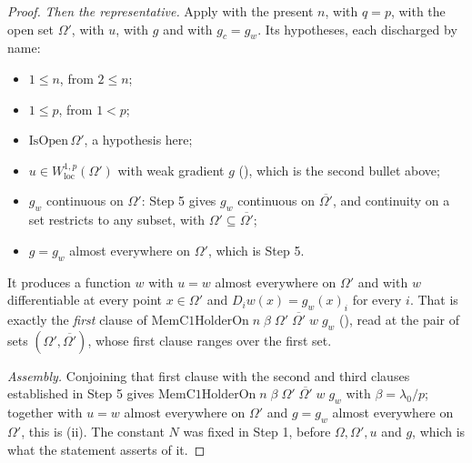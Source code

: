 \begin{proof}
\emph{Then the representative.}  Apply  with
the present $n$, with $q=p$, with the open set $\Omega'$, with $u$, with $g$ and
with $g_c=g_w$.  Its hypotheses, each discharged by name:
\begin{itemize}
\item $1\le n$, from $2\le n$;
\item $1\le p$, from $1<p$;
\item $\mathrm{IsOpen}\,\Omega'$, a hypothesis here;
\item $u\in W^{1,p}_{\mathrm{loc}}(\Omega')$ with weak gradient $g$
  (), which is the second bullet above;
\item $g_w$ continuous on $\Omega'$: Step 5 gives $g_w$ continuous on
  $\overline{\Omega'}$, and continuity on a set restricts to any subset, with
  $\Omega'\subseteq\overline{\Omega'}$;
\item $g=g_w$ almost everywhere on $\Omega'$, which is Step 5.
\end{itemize}
It produces a function $w$ with $u=w$ almost everywhere on $\Omega'$ and with
$w$ differentiable at every point $x\in\Omega'$ and $D_iw(x)=g_w(x)_i$ for every
$i$.  That is exactly the \emph{first} clause of
$\mathrm{MemC1HolderOn}\;n\;\beta\;\Omega'\;\overline{\Omega'}\;w\;g_w$
(), read at the pair of sets
$(\Omega',\overline{\Omega'})$, whose first clause ranges over the first set.

\emph{Assembly.}  Conjoining that first clause with the second and third
clauses established in Step 5 gives
$\mathrm{MemC1HolderOn}\;n\;\beta\;\Omega'\;\overline{\Omega'}\;w\;g_w$ with
$\beta=\lambda_0/p$; together with $u=w$ almost everywhere on $\Omega'$ and
$g=g_w$ almost everywhere on $\Omega'$, this is (ii).  The constant $N$ was
fixed in Step 1, before $\Omega,\Omega',u$ and $g$, which is what the statement
asserts of it.
\end{proof}
